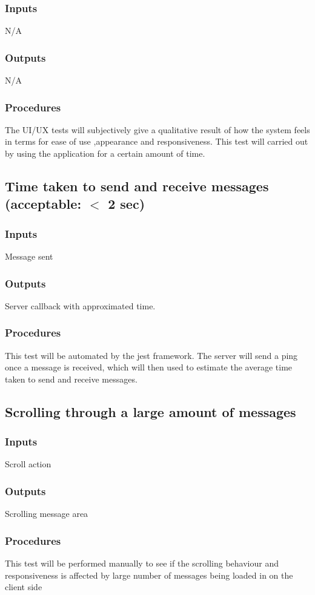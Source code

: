 \documentclass[12pt, titlepage]{article}
\begin{document}
\subsubsection{Inputs}
N/A
\subsubsection{Outputs}
N/A
\subsubsection{Procedures}
The UI/UX tests will subjectively give a qualitative result of how the system feels in terms for ease of use ,appearance and responsiveness. This test will carried out by using the application for a certain amount of time.
\subsection{Time taken to send and receive messages (acceptable: $<$ 2 sec)}
\subsubsection{Inputs}
Message sent
\subsubsection{Outputs}
Server callback with approximated time.
\subsubsection{Procedures}
This test will be automated by the jest framework. The server will send a ping once a message is received, which will then used to estimate the average time taken to send and receive messages.
\subsection{Scrolling through a large amount of messages}
\subsubsection{Inputs}
Scroll action
\subsubsection{Outputs}
Scrolling message area
\subsubsection{Procedures}
This test will be performed manually to see if the scrolling behaviour and responsiveness is affected by large number of messages being loaded in on the client side
\end{document}
